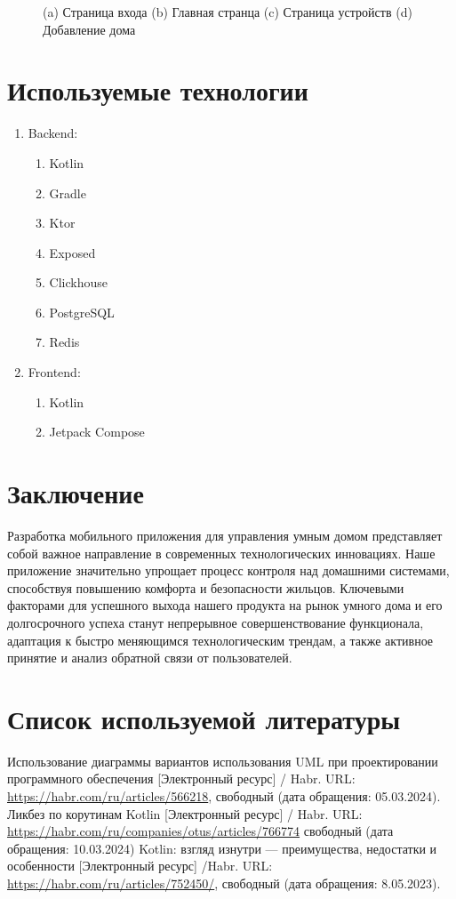 \documentclass{article}
\begin{document}
\begin{figure}[H]
    \caption{(a) Страница входа (b) Главная странца (c) Страница устройств (d) Добавление дома}
\end{figure}

\section{Используемые технологии}

\begin{enumerate}
    \item Backend:
        \begin{enumerate}
            \item Kotlin
            \item Gradle
            \item Ktor
            \item Exposed
            \item Clickhouse
            \item PostgreSQL
            \item Redis
        \end{enumerate}
    \item Frontend:
	  \begin{enumerate}
            \item Kotlin
            \item Jetpack Compose
        \end{enumerate}
\end{enumerate}

\section{Заключение}
Разработка мобильного приложения для управления умным домом представляет собой важное направление в современных технологических инновациях. Наше приложение значительно упрощает процесс контроля над домашними системами, способствуя повышению комфорта и безопасности жильцов. Ключевыми факторами для успешного выхода нашего продукта на рынок умного дома и его долгосрочного успеха станут непрерывное совершенствование функционала, адаптация к быстро меняющимся технологическим трендам, а также активное принятие и анализ обратной связи от пользователей.

\section{Список используемой литературы}

\begin{thebibliography}{}
     Использование диаграммы вариантов использования UML при проектировании программного обеспечения [Электронный ресурс] / Habr. URL: \url{https://habr.com/ru/articles/566218}, свободный (дата обращения: 05.03.2024).
     Ликбез по корутинам Kotlin [Электронный ресурс] / Habr. URL: \url{https://habr.com/ru/companies/otus/articles/766774} свободный (дата обращения: 10.03.2024)
     Kotlin: взгляд изнутри — преимущества, недостатки и особенности  [Электронный ресурс] /Habr. URL:  \url{https://habr.com/ru/articles/752450/}, свободный (дата обращения: 8.05.2023).
\end{thebibliography}
\end{document}

